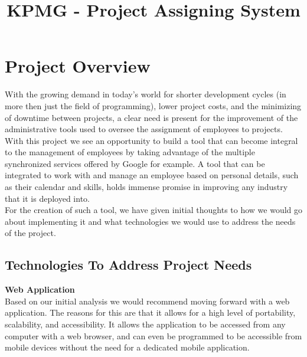 \documentclass[12pt]{article}
\title{KPMG - Project Assigning System}
\begin{document}
    \newcommand{\titleimage}{kpmg.png}
    
    
    
	
	\newpage

	\section{Project Overview}
	
	With the growing demand in today's world for shorter development cycles (in more then just the field of programming), lower project costs, and the minimizing of downtime between projects, a clear need is present for the improvement of the administrative tools used to oversee the assignment of employees to projects. With this project we see an opportunity to build a tool that can become integral to the management of employees by taking advantage of the multiple synchronized services offered by Google for example. A tool that can be integrated to work with and manage an employee based on personal details, such as their calendar and skills, holds immense promise in improving any industry that it is deployed into.\\
	
	For the creation of such a tool, we have given initial thoughts to how we would go about implementing it and what technologies we would use to address the needs of the project.
	
	\subsection*{Technologies To Address Project Needs}
	\textbf{Web Application}\\
	Based on our initial analysis we would recommend moving forward with a web application. The reasons for this are that it allows for a high level of portability, scalability, and accessibility. It allows the application to be accessed from any computer with a web browser, and can even be programmed to be accessible from mobile devices without the need for a dedicated mobile application.\\
		
\end{document}
